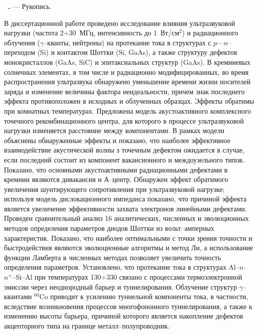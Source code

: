 \vspace{-1.3em}

\textbf{\thesisAuthorFIOru~\thesisTitleRu.} --- Рукопись.

\abstractBeginRu

В диссертационной работе проведено исследование влияния ультразвуковой нагрузки (частота 2$\div$30~МГц, интенсивность до 1~Вт/см$^2$)
и радиационного облучения ($\gamma$--кванты, нейтроны) на протекание тока в структурах с $p$---$n$--переходом (Si) и контактом Шоттки (Si, GaAs),
а также структуру дефектов монокристаллов  (GaAs, SiC) и эпитаксиальных структур (GaAs).
В кремниевых солнечных элементах, в том числе и радиационно модифицированных, во время распространения ультразвука обнаружено
уменьшение времени жизни носителей заряда и изменение величины фактора неидеальности,
причем знак последнего эффекта противоположен в исходных и облученных образцах.
Эффекты обратимы при комнатных температурах.
Предложена модель акустоактивного комплексного точечного рекомбинационного центра, для которого в процессе ультразвуковой нагрузки изменяется расстояние между компонентами.
В рамках модели объяснены обнаруженные эффекты и показано, что наиболее эффективное взаимодействие акустической волны з точечным дефектом ожидается в случае, если последний состоит из компонент вакансионного и междоузельного типов.
Показано, что основными акустоактивными радиационными дефектами в кремнии являются дивакансия и А--центр.
 Обнаружен эффект обратимого увеличения шунтирующего сопротивления при ультразвуковой нагрузке;
используя модель дислокационного импеданса показано, что причиной эффекта является увеличение эффективности захвата электронов линейными дефектами.
 Проведен сравнительный анализ 16 аналитических, численных и эволюционных методов определения параметров диодов Шоттки из вольт--амперных характеристик.
 Показано, что наиболее оптимальными с точки зрения точности и быстродействия являются эволюционные алгоритмы и метод Ли,
 а использование функции Ламберта в численных методах позволяет увеличить точность определения параметров.
  Установлено, что протекание тока в структурах Al--$n$--$n^+$--Si--Al при температурах 130$\div$330 связано с процессами термоэлектронной эмиссии через неоднородный барьер и туннелирования.
 Облучение структур $\gamma$--квантами $^{60}$Co приводит к усилению туннельной компоненты тока, в частности, вследствие возникновения процессов многофононного туннелирования,
 а также к изменению высоты барьера, причиной которого является накопление дефектов акцепторного типа на границе металл--полупроводник.
